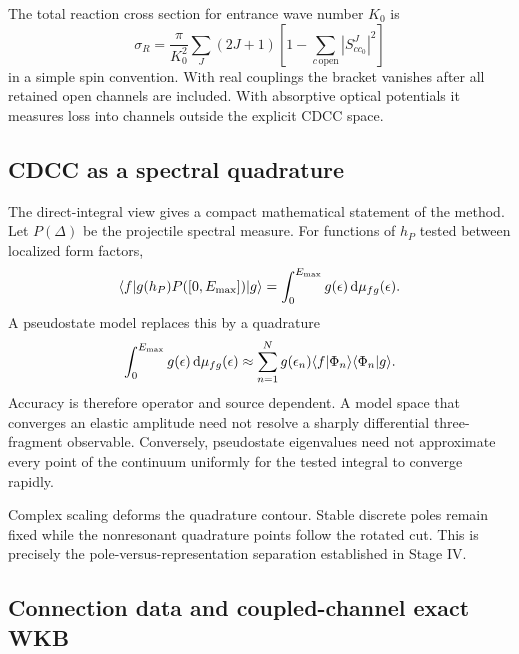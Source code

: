 The total reaction cross section for entrance wave number $K_0$ is
\begin{equation}
  \sigma_R=\frac{\pi}{K_0^2}
  \sum_J(2J+1)
  \left[1-\sum_{c\,\mathrm{open}}|S^J_{cc_0}|^2\right]
  \label{eq:cdcc-reaction-cross-section}
\end{equation}
in a simple spin convention.  With real couplings the bracket vanishes after
all retained open channels are included.  With absorptive optical potentials
it measures loss into channels outside the explicit CDCC space.

\subsection{CDCC as a spectral quadrature}
\label{subsec:cdcc-spectral-quadrature}

The direct-integral view gives a compact mathematical statement of the
method.  Let $P(\Delta)$ be the projectile spectral measure.  For functions
of $h_P$ tested between localized form factors,
\begin{equation}
  \langle f \rvert g(h_P)P([0,E_{\max}])\lvert g \rangle
  =\int_0^{E_{\max}}g(\epsilon)\,\mathrm{d}\mu_{fg}(\epsilon).
  \label{eq:cdcc-spectral-integral}
\end{equation}
A pseudostate model replaces this by a quadrature
\begin{equation}
  \int_0^{E_{\max}}g(\epsilon)\,\mathrm{d}\mu_{fg}(\epsilon)
  \approx\sum_{n=1}^{N}
  g(\epsilon_n)
  \langle f|\Phi_n \rangle\langle \Phi_n|g \rangle.
  \label{eq:cdcc-spectral-quadrature}
\end{equation}
Accuracy is therefore operator and source dependent.  A model space that
converges an elastic amplitude need not resolve a sharply differential
three-fragment observable.  Conversely, pseudostate eigenvalues need not
approximate every point of the continuum uniformly for the tested integral to
converge rapidly.

Complex scaling deforms the quadrature contour.  Stable discrete poles remain
fixed while the nonresonant quadrature points follow the rotated cut.  This is
precisely the pole-versus-representation separation established in Stage IV.

\subsection{Connection data and coupled-channel exact WKB}
\label{subsec:cdcc-exact-wkb-connection}

